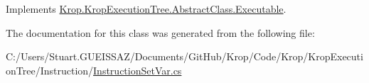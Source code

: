 Implements \mbox{\hyperlink{class_krop_1_1_krop_execution_tree_1_1_abstract_class_1_1_executable_ac32692ce44b5f938a90111ee27e7b684}{Krop.\+Krop\+Execution\+Tree.\+Abstract\+Class.\+Executable}}.



The documentation for this class was generated from the following file\+:\begin{DoxyCompactItemize}
\item 
C\+:/\+Users/\+Stuart.\+G\+U\+E\+I\+S\+S\+A\+Z/\+Documents/\+Git\+Hub/\+Krop/\+Code/\+Krop/\+Krop\+Execution\+Tree/\+Instruction/\mbox{\hyperlink{_instruction_set_var_8cs}{Instruction\+Set\+Var.\+cs}}\end{DoxyCompactItemize}
